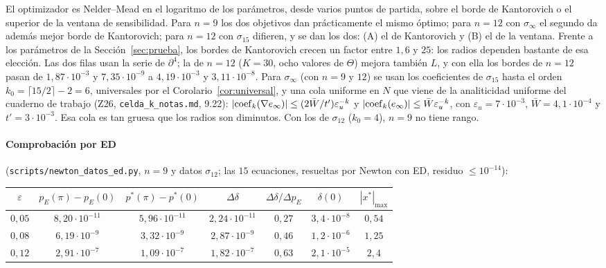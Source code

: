\documentclass[11pt,a4paper]{article}
\theoremstyle{definition}
\theoremstyle{remark}
\newcommand{\eps}{\varepsilon}
\newcommand{\pE}{p_{E}}
\newcommand{\scr}[1]{\texttt{scripts/#1}}
\begin{document}
\noindent
El optimizador es Nelder--Mead en el logaritmo de los parámetros, desde varios puntos de partida, sobre el borde
de Kantorovich o el superior de la ventana de sensibilidad. Para $n=9$ los dos objetivos dan prácticamente el
mismo óptimo; para $n=12$ con $\sigma_\infty$ el segundo da además mejor borde de Kantorovich; para $n=12$ con
$\sigma_{15}$ difieren, y se dan los dos: (A) el de Kantorovich y (B) el de la ventana. Frente a los parámetros
de la Sección~\ref{sec:prueba}, los bordes de Kantorovich crecen un factor entre $1{,}6$ y $25$: los radios
dependen bastante de esa elección. Las dos filas usan la serie de $\partial^4$; la de $n=12$ ($K=30$, ocho
valores de $\Theta$) mejora también $L$, y con ella los bordes de $n=12$ pasan de $1{,}87\cdot10^{-3}$ y
$7{,}35\cdot10^{-9}$ a $4{,}19\cdot10^{-3}$ y $3{,}11\cdot10^{-8}$. Para $\sigma_\infty$ (con $n=9$ y $12$) se usan los coeficientes de $\sigma_{15}$
hasta el orden $k_0=\lceil15/2\rceil-2=6$, universales por el Corolario~\ref{cor:universal}, y una cola uniforme
en $N$ que viene de la analiticidad uniforme del cuaderno de trabajo (Z26, \texttt{celda\_k\_notas.md}, 9.22):
$|{\rm coef}_k(\nabla e_\infty)|\le(2\bar W/t')\eps_u^{-k}$ y $|{\rm coef}_k(e_\infty)|\le\bar W\eps_u^{-k}$, con
$\eps_u=7\cdot10^{-3}$, $\bar W=4{,}1\cdot10^{-4}$ y $t'=3\cdot10^{-3}$. Esa cola es tan gruesa que los radios
son diminutos. Con los de $\sigma_{12}$ ($k_0=4$), $n=9$ no tiene rango.

\paragraph{Comprobación por ED} (\scr{newton\_datos\_ed.py}, $n=9$ y datos $\sigma_{12}$; las $15$ ecuaciones,
resueltas por Newton con ED, residuo $\le10^{-14}$):

\begin{center}
\begin{tabular}{ccccccc}
\toprule
$\eps$ & $\pE(\pi)-\pE(0)$ & $p^*(\pi)-p^*(0)$ & $\Delta\delta$ & $\Delta\delta/\Delta\pE$ & $\delta(0)$ & $|x^*|_{\max}$\\
\midrule
$0{,}05$ & $8{,}20\cdot10^{-11}$ & $5{,}96\cdot10^{-11}$ & $2{,}24\cdot10^{-11}$ & $0{,}27$ & $3{,}4\cdot10^{-8}$ & $0{,}54$\\
$0{,}08$ & $6{,}19\cdot10^{-9}$ & $3{,}32\cdot10^{-9}$ & $2{,}87\cdot10^{-9}$ & $0{,}46$ & $1{,}2\cdot10^{-6}$ & $1{,}25$\\
$0{,}12$ & $2{,}91\cdot10^{-7}$ & $1{,}09\cdot10^{-7}$ & $1{,}82\cdot10^{-7}$ & $0{,}63$ & $2{,}1\cdot10^{-5}$ & $2{,}4$\\
\bottomrule
\end{tabular}
\end{center}
\end{document}
